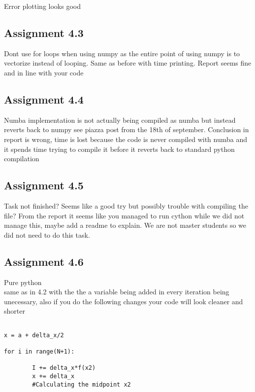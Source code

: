 \documentclass[a4paper]{article}
\begin{document}
Error plotting looks good



\subsection*{Assignment 4.3}

Dont use for loops when using numpy as the entire point of using numpy is to vectorize instead of looping. Same as before with time printing.
Report seems fine and in line with your code 

\subsection*{Assignment 4.4}
Numba implementation is not actually being compiled as numba but instead reverts back to numpy
see piazza post from the 18th of september. 
Conclusion in report is wrong, time is lost because the code is never compiled with numba and it spends time trying to compile it before it reverts back to standard python compilation

\subsection*{Assignment 4.5}

Task not finished? Seems like a good try but possibly trouble with compiling the file?
From the report it seems like you managed to run cython while we did not manage this, maybe add a readme to explain.
We are not master students so we did not need to do this task.

\subsection*{Assignment 4.6}

Pure python \\
same as in 4.2 with the the a variable being added in every iteration being unecessary, also if you do the following changes your code will look cleaner and shorter


\begin{verbatim}

x = a + delta_x/2

for i in range(N+1):

		I += delta_x*f(x2)
		x += delta_x
		#Calculating the midpoint x2

\end{verbatim}
\end{document}
